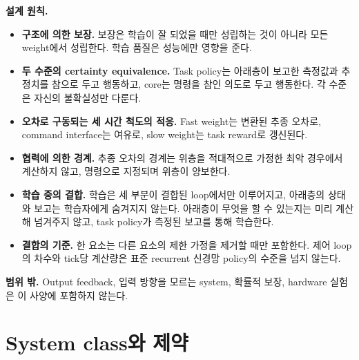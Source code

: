 \documentclass[11pt]{article}\usepackage[margin=1in]{geometry}\usepackage{amsmath,amssymb,amsthm,mathtools}\usepackage{graphicx}\graphicspath{{figures/}{../figures/}{figs/}{./}}\usepackage{enumitem}\usepackage{hyperref}\usepackage{cleveref}\usepackage{tikz}\usetikzlibrary{arrows.meta,positioning,calc,shapes.geometric}\usepackage{float}\usepackage{rotating}\usepackage[most]{tcolorbox}\usepackage{kotex}\usepackage{booktabs}\emergencystretch=1.6em\tolerance=2000 \crefname{assumption}{Assumption}{Assumptions}\Crefname{assumption}{Assumption}{Assumptions}\crefname{definition}{Definition}{Definitions}\Crefname{definition}{Definition}{Definitions}\crefname{proposition}{Proposition}{Propositions}\Crefname{proposition}{Proposition}{Propositions}\crefname{fact}{Fact}{Facts}\Crefname{fact}{Fact}{Facts} \newtheorem{assumption}{Assumption}\newtheorem{definition}{Definition}\newtheorem{lemma}{Lemma}\newtheorem{proposition}{Proposition}\newtheorem{theorem}{Theorem}\newtheorem{corollary}{Corollary}\newtheorem{fact}{Fact}\theoremstyle{remark}\newtheorem{remark}{Remark} \newcommand{\R}{\mathbb{R}}\newcommand{\xb}{\bar x}\newcommand{\Ab}{\bar A}\newcommand{\By}{\bar B_y}\newcommand{\U}{\mathcal U}\newcommand{\Z}{\mathcal Z}
\begin{document}
\textbf{설계 원칙.}
\begin{itemize}
\item \textbf{구조에 의한 보장.} 보장은 학습이 잘 되었을 때만 성립하는 것이 아니라 모든 weight에서 성립한다. 학습 품질은 성능에만 영향을 준다.
\item \textbf{두 수준의 certainty equivalence.} Task policy는 아래층이 보고한 측정값과 추정치를 참으로 두고 행동하고, core는 명령을 참인 의도로 두고 행동한다. 각 수준은 자신의 불확실성만 다룬다.
\item \textbf{오차로 구동되는 세 시간 척도의 적응.} Fast weight는 변환된 추종 오차로, command interface는 여유로, slow weight는 task reward로 갱신된다.
\item \textbf{협력에 의한 경계.} 추종 오차의 경계는 위층을 적대적으로 가정한 최악 경우에서 계산하지 않고, 명령으로 지정되며 위층이 양보한다.
\item \textbf{학습 중의 결합.} 학습은 세 부분이 결합된 loop에서만 이루어지고, 아래층의 상태와 보고는 학습자에게 숨겨지지 않는다. 아래층이 무엇을 할 수 있는지는 미리 계산해 넘겨주지 않고, task policy가 측정된 보고를 통해 학습한다.
\item \textbf{결합의 기준.} 한 요소는 다른 요소의 제한 가정을 제거할 때만 포함한다. 제어 loop의 차수와 tick당 계산량은 표준 recurrent 신경망 policy의 수준을 넘지 않는다.
\end{itemize}

\textbf{범위 밖.} Output feedback, 입력 방향을 모르는 system, 확률적 보장, hardware 실험은 이 사양에 포함하지 않는다.

\section{System class와 제약}
\label{sec:plant}
\end{document}
